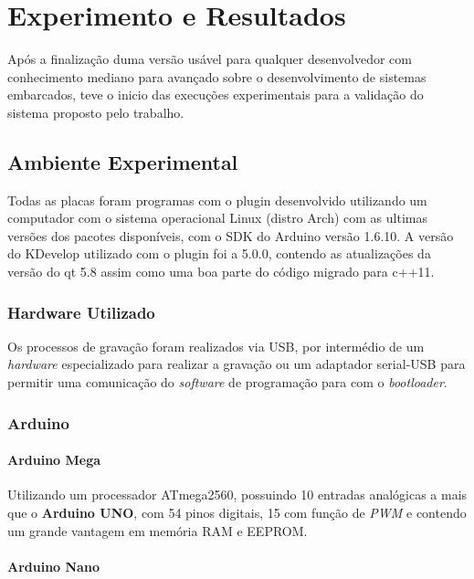 \chapter{Experimento e Resultados}
Após a finalização duma versão usável para qualquer desenvolvedor com conhecimento mediano para avançado sobre o desenvolvimento de sistemas embarcados, teve o inicio das execuções experimentais para a validação do sistema proposto pelo trabalho.

\section{Ambiente Experimental}

Todas as placas foram programas com o plugin desenvolvido utilizando um computador com o sistema operacional Linux (distro Arch) com as ultimas versões dos pacotes disponíveis, com o SDK do Arduino versão 1.6.10. A versão do KDevelop utilizado com o plugin foi a 5.0.0, contendo as atualizações da versão do qt 5.8 assim como uma boa parte do código migrado para c++11.

\subsection{Hardware Utilizado}

Os processos de gravação foram realizados via USB, por intermédio de um \textit{hardware} especializado para realizar a gravação ou um adaptador serial-USB para permitir uma comunicação do \textit{software} de programação para com o \textit{bootloader}.

\subsection{Arduino}

\subsubsection{Arduino Mega}
Utilizando um processador ATmega2560, possuindo 10 entradas analógicas a mais que o \textbf{Arduino UNO}, com 54 pinos digitais, 15 com função de \textit{PWM} e contendo um grande vantagem em memória RAM e EEPROM.



\subsubsection{Arduino Nano}

